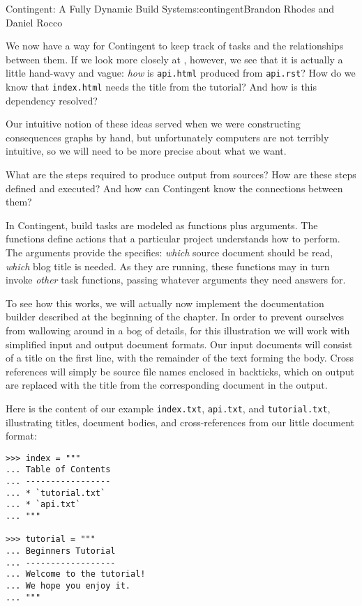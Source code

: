 \begin{aosachapter}{Contingent: A Fully Dynamic Build System}{s:contingent}{Brandon Rhodes and Daniel Rocco}
\label{learning-connections}

We now have a way for Contingent to keep track of tasks and the
relationships between them. If we look more closely at
, however, we see that it is actually
a little hand-wavy and vague: \emph{how} is \texttt{api.html} produced
from \texttt{api.rst}? How do we know that \texttt{index.html} needs the
title from the tutorial? And how is this dependency resolved?

Our intuitive notion of these ideas served when we were constructing
consequences graphs by hand, but unfortunately computers are not
terribly intuitive, so we will need to be more precise about what we
want.

What are the steps required to produce output from sources? How are
these steps defined and executed? And how can Contingent know the
connections between them?

In Contingent, build tasks are modeled as functions plus arguments. The
functions define actions that a particular project understands how to
perform. The arguments provide the specifics: \emph{which} source
document should be read, \emph{which} blog title is needed. As they are
running, these functions may in turn invoke \emph{other} task functions,
passing whatever arguments they need answers for.

To see how this works, we will actually now implement the documentation
builder described at the beginning of the chapter. In order to prevent
ourselves from wallowing around in a bog of details, for this
illustration we will work with simplified input and output document
formats. Our input documents will consist of a title on the first line,
with the remainder of the text forming the body. Cross references will
simply be source file names enclosed in backticks, which on output are
replaced with the title from the corresponding document in the output.

Here is the content of our example \texttt{index.txt}, \texttt{api.txt},
and \texttt{tutorial.txt}, illustrating titles, document bodies, and
cross-references from our little document format:

\begin{verbatim}
>>> index = """
... Table of Contents
... -----------------
... * `tutorial.txt`
... * `api.txt`
... """

>>> tutorial = """
... Beginners Tutorial
... ------------------
... Welcome to the tutorial!
... We hope you enjoy it.
... """


\end{verbatim}
\end{aosachapter}
